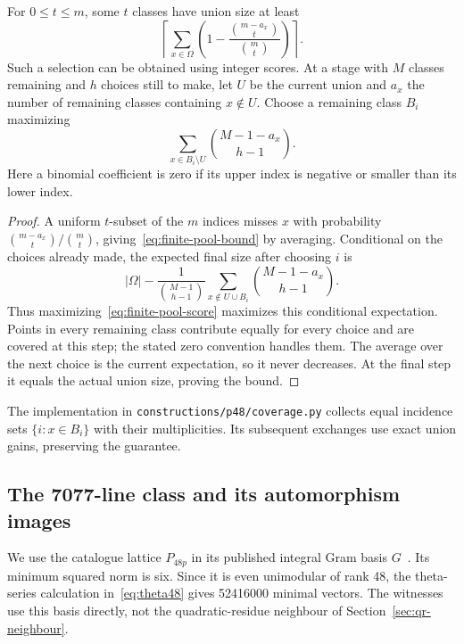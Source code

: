 \begin{proposition}\label{prop:finite-pool}
For $0\le t\le m$, some $t$ classes have union size at least
\begin{equation}\label{eq:finite-pool-bound}
 \left\lceil\sum_{x\in\Omega}
 \left(1-\frac{\binom{m-a_x}{t}}{\binom mt}\right)\right\rceil.
\end{equation}
Such a selection can be obtained using integer scores. At a stage with
$M$ classes remaining and $h$ choices still to make, let $U$ be the
current union and $a_x$ the number of remaining classes containing
$x\notin U$. Choose a remaining class $B_i$ maximizing
\begin{equation}\label{eq:finite-pool-score}
 \sum_{x\in B_i\setminus U}\binom{M-1-a_x}{h-1}.
\end{equation}
Here a binomial coefficient is zero if its upper index is negative
or smaller than its lower index.
\end{proposition}
\begin{proof}
A uniform $t$-subset of the $m$ indices misses $x$ with probability
$\binom{m-a_x}{t}/\binom mt$, giving~\eqref{eq:finite-pool-bound}
by averaging. Conditional on the choices already made, the expected
final size after choosing $i$ is
\[
 |\Omega|-\frac{1}{\binom{M-1}{h-1}}
       \sum_{x\notin U\cup B_i}\binom{M-1-a_x}{h-1}.
\]
Thus maximizing~\eqref{eq:finite-pool-score} maximizes this
conditional expectation. Points in every remaining class contribute
equally for every choice and are covered at this step; the stated
zero convention handles them. The average over the next choice is
the current expectation, so it never decreases. At the final step
it equals the actual union size, proving the bound.
\end{proof}

The implementation in \texttt{constructions/p48/coverage.py} collects
equal incidence sets $\{i:x\in B_i\}$ with their multiplicities.
Its subsequent exchanges use exact union gains, preserving the guarantee.

\subsection{The 7077-line class and its automorphism images}
\label{sec:p48-update}
We use the catalogue lattice $P_{48p}$ in its published
integral Gram basis $G$~\cite{p48p-catalogue}. Its minimum squared norm
is six. Since it is even unimodular of rank 48, the theta-series
calculation in~\eqref{eq:theta48} gives 52416000 minimal vectors.
The witnesses use this basis directly, not the quadratic-residue
neighbour of Section~\ref{sec:qr-neighbour}.

